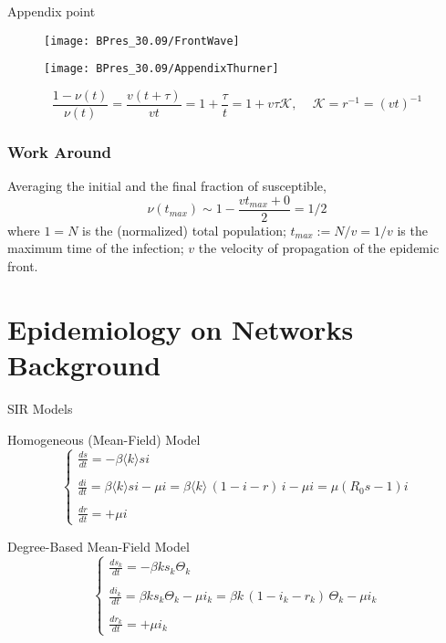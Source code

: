 \documentclass{beamer}
\begin{document}
\begin{frame}{Appendix point}
	\begin{figure}
		\texttt{[image: BPres\_30.09/FrontWave]}
	\end{figure}
	\vspace{-.3cm}
	\begin{figure}
		\texttt{[image: BPres\_30.09/AppendixThurner]}
	\end{figure} \vfill
	\begin{equation*}
		\frac{1-\nu(t)}{\nu(t)} = \frac{v(t+\tau)}{vt} = 1+\frac{\tau}{t} = 1+v \tau \mathcal{K}, \quad \, \mathcal{K} = r^{-1} = (vt)^{-1}
	\end{equation*}
\end{frame}

\begin{frame}
	\frametitle{Work Around}
	Averaging the initial and the final fraction of susceptible, 
	\begin{equation}
		\nu(t_{max}) \sim 1-\frac{vt_{max}+0}{2} = 1/2
	\end{equation}
	where $1 = N$ is the (normalized) total population; $ t_{max}:= N/v = 1/v$ is the maximum time of the infection; $v$ the velocity of propagation of the epidemic front.  
\end{frame}

\section{Epidemiology on Networks Background}
\begin{frame}{SIR Models}
\vspace{-1mm}
\begin{block}{Homogeneous (Mean-Field) Model}
	\begin{equation}
		\begin{cases}
			\frac{ds}{dt} = -\beta \langle k \rangle s i \\ \\ 
			\frac{di}{dt} = \beta \langle k \rangle s i - \mu i = \beta \langle k \rangle \, (1-i-r) \, i -\mu i = \mu( R_0 s - 1) i  \label{eq:SIR_MF}	\\ \\
			\frac{dr}{dt} = +\mu i
		\end{cases}
	\end{equation} 
\end{block}
\begin{block}{Degree-Based Mean-Field Model}
	\begin{equation}
		\begin{cases}
			\frac{ds_k}{dt} = -\beta  k  s_k \Theta_k \\ \\ 
			\frac{di_k}{dt} = \beta  k  s_k \Theta_k - \mu i_k = \beta  k  \, (1-i_k-r_k) \, \Theta_k -\mu i_k \label{eqs:SIR_degree-based} \\ \\
			\frac{dr_k}{dt} = +\mu i_k
		\end{cases}	
	\end{equation}
\end{block}
\end{frame}
\end{document}
